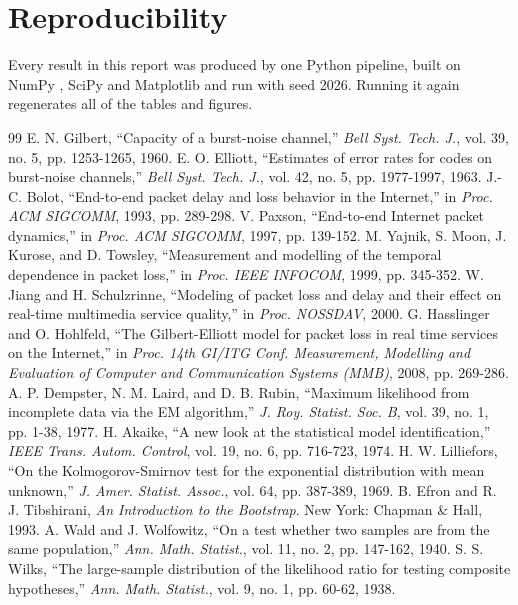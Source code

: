 \documentclass[conference]{IEEEtran}
\begin{document}
\section*{Reproducibility}
Every result in this report was produced by one Python pipeline, built on NumPy \cite{numpy2020}, SciPy \cite{scipy2020} and Matplotlib \cite{matplotlib2007} and run with seed 2026. Running it again regenerates all of the tables and figures.

\begin{thebibliography}{99}
 E. N. Gilbert, ``Capacity of a burst-noise channel,'' \emph{Bell Syst. Tech. J.}, vol. 39, no. 5, pp. 1253-1265, 1960.
 E. O. Elliott, ``Estimates of error rates for codes on burst-noise channels,'' \emph{Bell Syst. Tech. J.}, vol. 42, no. 5, pp. 1977-1997, 1963.
 J.-C. Bolot, ``End-to-end packet delay and loss behavior in the Internet,'' in \emph{Proc. ACM SIGCOMM}, 1993, pp. 289-298.
 V. Paxson, ``End-to-end Internet packet dynamics,'' in \emph{Proc. ACM SIGCOMM}, 1997, pp. 139-152.
 M. Yajnik, S. Moon, J. Kurose, and D. Towsley, ``Measurement and modelling of the temporal dependence in packet loss,'' in \emph{Proc. IEEE INFOCOM}, 1999, pp. 345-352.
 W. Jiang and H. Schulzrinne, ``Modeling of packet loss and delay and their effect on real-time multimedia service quality,'' in \emph{Proc. NOSSDAV}, 2000.
 G. Hasslinger and O. Hohlfeld, ``The Gilbert-Elliott model for packet loss in real time services on the Internet,'' in \emph{Proc. 14th GI/ITG Conf. Measurement, Modelling and Evaluation of Computer and Communication Systems (MMB)}, 2008, pp. 269-286.
 A. P. Dempster, N. M. Laird, and D. B. Rubin, ``Maximum likelihood from incomplete data via the EM algorithm,'' \emph{J. Roy. Statist. Soc. B}, vol. 39, no. 1, pp. 1-38, 1977.
 H. Akaike, ``A new look at the statistical model identification,'' \emph{IEEE Trans. Autom. Control}, vol. 19, no. 6, pp. 716-723, 1974.
 H. W. Lilliefors, ``On the Kolmogorov-Smirnov test for the exponential distribution with mean unknown,'' \emph{J. Amer. Statist. Assoc.}, vol. 64, pp. 387-389, 1969.
 B. Efron and R. J. Tibshirani, \emph{An Introduction to the Bootstrap}. New York: Chapman \& Hall, 1993.
 A. Wald and J. Wolfowitz, ``On a test whether two samples are from the same population,'' \emph{Ann. Math. Statist.}, vol. 11, no. 2, pp. 147-162, 1940.
 S. S. Wilks, ``The large-sample distribution of the likelihood ratio for testing composite hypotheses,'' \emph{Ann. Math. Statist.}, vol. 9, no. 1, pp. 60-62, 1938.

\end{thebibliography}
\end{document}
